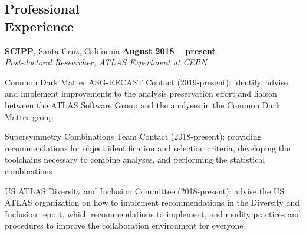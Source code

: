 \documentclass[margin,line]{resume}
\let\origsection\section%
\let\section\subsection%
\let\section\origsection%
\begin{document}
\begin{resume}
\section{\mysidestyle Professional\\Experience}

\textbf{SCIPP}, Santa Cruz, California \hfill \textbf{August 2018 -- present}\\
\textsl{Post-doctoral Researcher, ATLAS Experiment at CERN}
\begin{list2}
  \item Common Dark Matter ASG-RECAST Contact (2019-present): identify, advise, and implement improvements to the analysis preservation effort and liaison between the ATLAS Software Group and the analyses in the Common Dark Matter group
  \item Supersymmetry Combinations Team Contact (2018-present): providing recommendations for object identification and selection criteria, developing the toolchains necessary to combine analyses, and performing the statistical combinations
  \item US ATLAS Diversity and Inclusion Committee (2018-present): advise the US ATLAS organization on how to implement recommendations in the Diversity and Inclusion report, which recommendations to implement, and modify practices and procedures to improve the collaboration environment for everyone
\end{list2}

\newpage


\end{resume}
\end{document}
